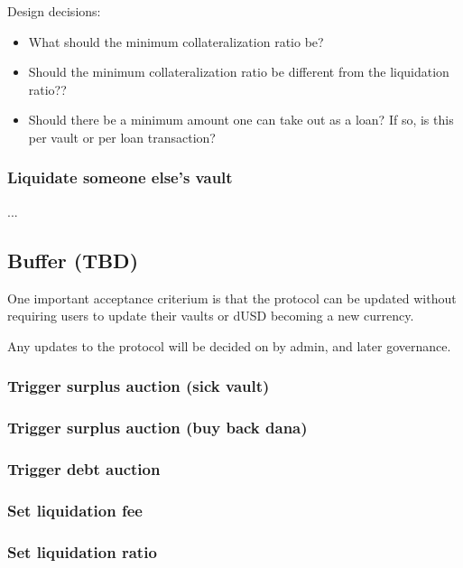 \documentclass{article} %
\begin{document}
Design decisions:
\begin{itemize}
  \item What should the minimum collateralization ratio be?
  \item Should the minimum collateralization ratio be different from the
    liquidation ratio??
  \item Should there be a minimum amount one can take out as a loan? If so, is
    this per vault or per loan transaction?
\end{itemize}

\subsubsection{Liquidate someone else's vault}

...

\subsection{Buffer (TBD)}

One important acceptance criterium is that the protocol can be updated without
requiring users to update their vaults or dUSD becoming a new currency.

Any updates to the protocol will be decided on by admin, and later governance.

\subsubsection{Trigger surplus auction (sick vault)}

\subsubsection{Trigger surplus auction (buy back dana)}

\subsubsection{Trigger debt auction}

\subsubsection{Set liquidation fee}

\subsubsection{Set liquidation ratio}
\end{document}
